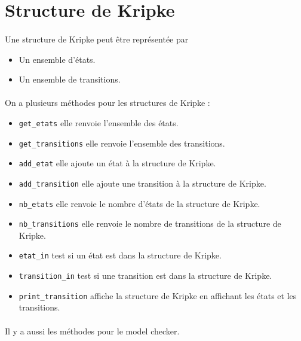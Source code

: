 \documentclass[12pt,a4paper]{report}
\begin{document}
\newpage

\section*{Structure de Kripke}

\paragraph{}Une structure de Kripke peut être représentée par
\begin{itemize}
    \item Un ensemble d'états.
    \item Un ensemble de transitions.
\end{itemize}

\paragraph{}On a plusieurs méthodes pour les structures de Kripke :
\begin{itemize}
    \item \verb+get_etats+ elle renvoie l'ensemble des états.
    \item \verb+get_transitions+ elle renvoie l'ensemble des transitions.
    \item \verb+add_etat+ elle ajoute un état à la structure de Kripke.
    \item \verb+add_transition+ elle ajoute une transition à la structure de Kripke.
    \item \verb+nb_etats+ elle renvoie le nombre d'états de la structure de Kripke.
    \item \verb+nb_transitions+ elle renvoie le nombre de transitions de la structure de Kripke.
    \item \verb+etat_in+ test si un état est dans la structure de Kripke.
    \item \verb+transition_in+ test si une transition est dans la structure de Kripke.
    \item \verb+print_transition+ affiche la structure de Kripke en affichant les états et les transitions.
\end{itemize}

\paragraph{}Il y a aussi les méthodes pour le model checker.
\end{document}

